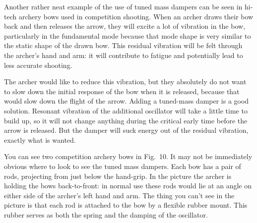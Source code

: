

  Another rather neat example of the use of tuned mass dampers can be seen in 
  hi-tech archery bows used in competition shooting. When an archer draws their 
  bow back and then releases the arrow, they will excite a lot of vibration in 
  the bow, particularly in the fundamental mode because that mode shape is very 
  similar to the static shape of the drawn bow. This residual vibration will be 
  felt through the archer’s hand and arm: it will contribute to fatigue and 
  potentially lead to less accurate shooting. 

  The archer would like to reduce this vibration, but they absolutely do not 
  want to slow down the initial response of the bow when it is released, 
  because that would slow down the flight of the arrow. Adding a tuned-mass 
  damper is a good solution. Resonant vibration of the additional oscillator 
  will take a little time to build up, so it will not change anything during 
  the critical early time before the arrow is released. But the damper will 
  suck energy out of the residual vibration, exactly what is wanted. 

  You can see two competition archery bows in Fig.\ 10. It may not be 
  immediately obvious where to look to see the tuned mass dampers. Each bow has 
  a pair of rods, projecting from just below the hand-grip. In the picture the 
  archer is holding the bows back-to-front: in normal use these rods would lie 
  at an angle on either side of the archer’s left hand and arm. The thing you 
  can't see in the picture is that each rod is attached to the bow by a 
  flexible rubber mount. This rubber serves as both the spring and the damping 
  of the oscillator. 


